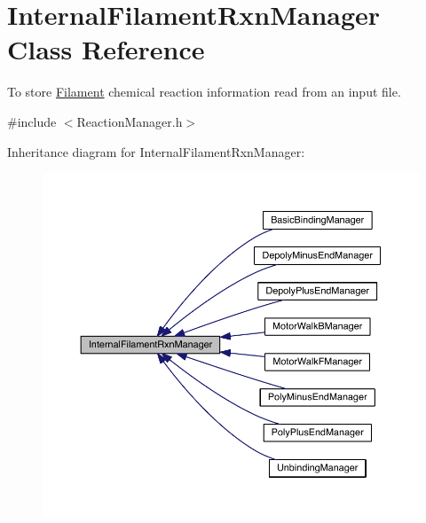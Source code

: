 \hypertarget{classInternalFilamentRxnManager}{\section{Internal\+Filament\+Rxn\+Manager Class Reference}
\label{classInternalFilamentRxnManager}
}


To store \hyperlink{classFilament}{Filament} chemical reaction information read from an input file.  




{\ttfamily \#include $<$Reaction\+Manager.\+h$>$}



Inheritance diagram for Internal\+Filament\+Rxn\+Manager\+:\nopagebreak
\begin{figure}[H]
\begin{center}
\leavevmode
\includegraphics[width=350pt]{classInternalFilamentRxnManager__inherit__graph}
\end{center}
\end{figure}


